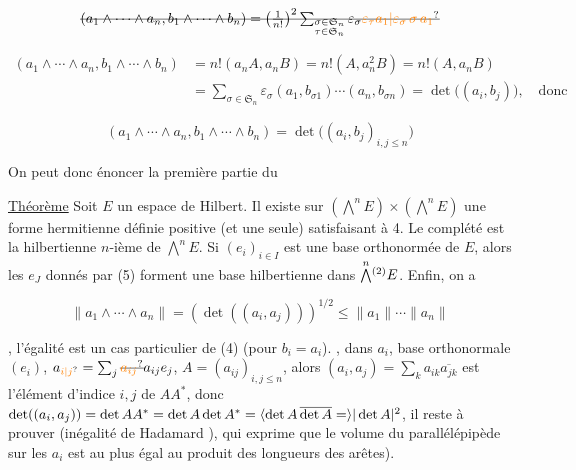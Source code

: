 \[
\deleted{(a_1\wedge\cdots\wedge a_n,b_1\wedge\cdots\wedge b_n)=\left(\frac1{n!}\right)^2\sum_{\substack{\sigma\in\mathfrak S_n\\\tau\in\mathfrak S_n}}\varepsilon_\sigma\unsure{\varepsilon_\tau a_1|\varepsilon_\sigma\,\sigma\,a_1}}
\]

\[
\begin{aligned}
(a_1\wedge\cdots\wedge a_n,b_1\wedge\cdots\wedge b_n)&=n!(a_n A,a_n B)=n!(A,a_n^2B)=n!(A,a_nB)\\
&=\sum_{\sigma\in\mathfrak S_n}\varepsilon_\sigma(a_1,b_{\sigma1})\cdots(a_n,b_{\sigma n})=\det\big((a_i,b_j)\big),\quad\text{donc}
\end{aligned}
\]

\[
\boxed{(a_1\wedge\cdots\wedge a_n,b_1\wedge\cdots\wedge b_n)=\det\big((a_i,b_j)_{i,j\leq n}\big)} \tag*{(4)}
\]


On peut donc énoncer la première partie du

 \uline{Théorème} Soit  $E$ un espace de Hilbert. Il existe sur
$(\overset{n}{\bigwedge}E)\times(\overset{n}{\bigwedge}E)$ une forme hermitienne définie positive (et une seule)
satisfaisant à 4. Le complété est la   hilbertienne
$n$-ième de $\overset{n}{\bigwedge}E$.  Si $(e_i)_{i\in I}$ est une base  orthonormée
de $E$, alors les $e_J$ donnés par (5) forment une base
 hilbertienne
 dans $\overset{n}{\bigwedge}\vphantom{\bigwedge}^{(2)}E$. Enfin, on a

\[
\boxed{\|a_1\wedge\cdots\wedge a_n\|=(\det((a_i,a_j)))^{1/2}\leq\|a_1\|\cdots\|a_n\|} \tag*{(5)}
\]

, l'égalité  est un cas particulier de (4) (pour $b_i=a_i$).
, dans   $a_i$, 
base orthonormale $(e_i)$, 
  $a_{\unsure{i|j}}=\sum_j\deleted{\unsure{a_{ij}}}a_{ij}e_j$,
 $A=(a_{ij})_{i,j\leq n}$, alors $(a_i,a_j)=\sum_k a_{ik}\overline{a_{jk}}$
est l'élément d'indice $i,j$ de  $AA^*$, donc
$\det((a_i,a_j))=\det AA^*=\det A\det A^*=\inserted{\det A\,\overline{\det A}=}|\det A|^2$,  il
reste à prouver  (inégalité
de Hadamard \unsure{!}), qui exprime que le volume du
parallélépipède  sur les $a_i$ est au plus
égal au produit des longueurs des arêtes).

